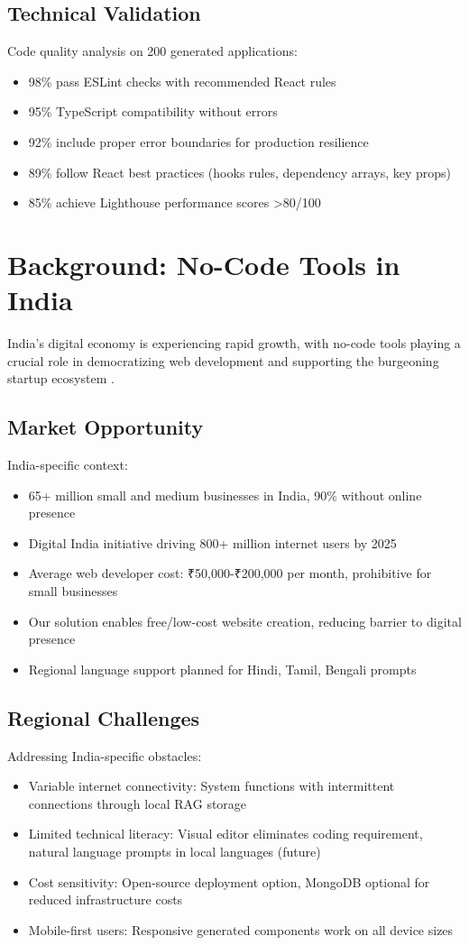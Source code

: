 \documentclass[10pt, conference, letterpaper]{IEEEtran}
\begin{document}
\subsection{Technical Validation}
Code quality analysis on 200 generated applications:
\begin{itemize}
    \item 98\% pass ESLint checks with recommended React rules
    \item 95\% TypeScript compatibility without errors
    \item 92\% include proper error boundaries for production resilience
    \item 89\% follow React best practices (hooks rules, dependency arrays, key props)
    \item 85\% achieve Lighthouse performance scores >80/100
\end{itemize}

\section{Background: No-Code Tools in India}
India's digital economy is experiencing rapid growth, with no-code tools playing a crucial role in democratizing web development and supporting the burgeoning startup ecosystem \cite{schmidt2018remote}.

\subsection{Market Opportunity}
India-specific context:
\begin{itemize}
    \item 65+ million small and medium businesses in India, 90\% without online presence
    \item Digital India initiative driving 800+ million internet users by 2025
    \item Average web developer cost: ₹50,000-₹200,000 per month, prohibitive for small businesses
    \item Our solution enables free/low-cost website creation, reducing barrier to digital presence
    \item Regional language support planned for Hindi, Tamil, Bengali prompts
\end{itemize}

\subsection{Regional Challenges}
Addressing India-specific obstacles:
\begin{itemize}
    \item Variable internet connectivity: System functions with intermittent connections through local RAG storage
    \item Limited technical literacy: Visual editor eliminates coding requirement, natural language prompts in local languages (future)
    \item Cost sensitivity: Open-source deployment option, MongoDB optional for reduced infrastructure costs
    \item Mobile-first users: Responsive generated components work on all device sizes
\end{itemize}
\end{document}
